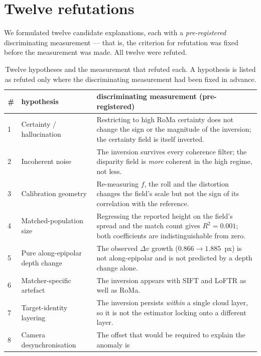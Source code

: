 \documentclass[11pt,a4paper]{article}
\begin{document}
\section{Twelve refutations}
\label{sec:refutations}

We formulated twelve candidate explanations, each with a \emph{pre-registered} discriminating
measurement --- that is, the criterion for refutation was fixed before the measurement was
made. All twelve were refuted.

\begin{table}[t]
\centering
\caption{Twelve hypotheses and the measurement that refuted each. A hypothesis is listed as
refuted only where the discriminating measurement had been fixed in advance.}
\label{tab:refutations}
\scriptsize
\begin{tabular}{@{}p{}p{}p{}@{}}
\toprule
\# & hypothesis & discriminating measurement (pre-registered) \\
\midrule
1 & Certainty / hallucination & Restricting to high RoMa certainty does not change the sign or
  the magnitude of the inversion; the certainty field is itself inverted. \\
2 & Incoherent noise & The inversion survives every coherence filter; the disparity field is
  \emph{more} coherent in the high regime, not less. \\
3 & Calibration geometry & Re-measuring $f$, the roll and the distortion changes the field's
  scale but not the sign of its correlation with the reference. \\
4 & Matched-population size & Regressing the reported height on the field's spread and the
  match count gives $R^2 = 0.001$; both coefficients are indistinguishable from zero. \\
5 & Pure along-epipolar depth change & The observed $\Delta v$ growth ($0.866 \to 1.885$~px)
  is not along-epipolar and is not predicted by a depth change alone. \\
6 & Matcher-specific artefact & The inversion appears with SIFT and LoFTR as well as RoMa. \\
7 & Target-identity layering & The inversion persists \emph{within} a single cloud layer, so
  it is not the estimator locking onto a different layer. \\
8 & Camera desynchronisation & The offset that would be required to explain the anomaly is

\end{tabular}
\end{table}
\end{document}

